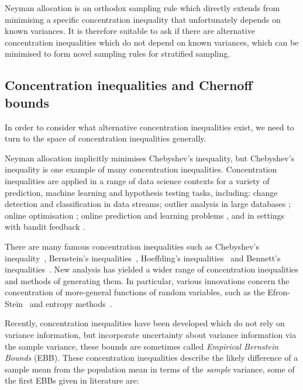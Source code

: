 Neyman allocation is an orthodox sampling rule which directly extends from minimising a specific concentration inequality that unfortunately depends on known variances.
It is therefore suitable to ask if there are alternative concentration inequalities which do not depend on known variances, which can be minimised to form novel sampling rules for stratified sampling.




\subsection{Concentration inequalities and Chernoff bounds}

In order to consider what alternative concentration inequalities exist, we need to turn to the space of concentration inequalities generally. 

Neyman allocation implicitly minimises Chebyshev's inequality, but Chebyshev's inequality is one example of many concentration inequalities.
Concentration inequalities are applied in a range of data science contexts for a variety of prediction, machine learning and hypothesis testing tasks, including:
change detection \citep{KiferShaiGehrke2004,8000571} 
and classification \citep{Zia-UrRehman2012} in data streams;
outlier analysis in large databases \citep{Aggarwal2015};
online optimisation \citep{FlaxmanKalaiMcMahan2005,AgarwalDekelXiao2010}; 
online prediction and learning problems \citep{%
Mnih:2008:EBS:1390156.1390241,DBLP:conf/aaai/ThomasTG15,Maurer50empiricalbernstein},
and in settings with bandit feedback \citep{AuerCesa-BianchiEtal_SIAM2003,AudibertBubeck_COLT2009,Tran-ThanhChapmanRJ_AAAI2009}.

There are many famous concentration inequalities such as Chebyshev's inequality~\citep{Chebyshev1}, Bernstein's inequalities~\citep{Burnstein1}, 
Hoeffding's inequalities~\citep{hoeffding1} and Bennett's inequalities~\citep{10.2307/2282438}.
New analysis has yielded a wider range of concentration inequalities and methods of generating them.
In particular, various innovations concern the concentration of more-general functions of random variables, such as 
the Efron-Stein~\citep{efron1981} and 
entropy methods~\citep{Boucheron_concentrationinequalities}.%

Recently, concentration inequalities have been developed which do not rely on variance information, but incorporate uncertainty about variance information via the sample variance, these bounds are sometimes called \textit{Empirical Bernstein Bounds} (EBB).
These concentration inequalities describe the likely difference of a sample mean from the population mean in terms of the \textit{sample} variance, some of the first EBBs given in literature are:

